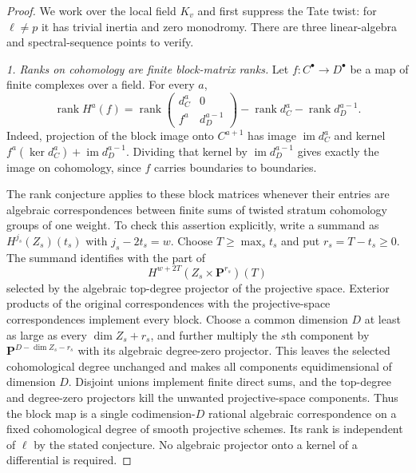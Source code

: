 \begin{proof}
We work over the local field $K_v$ and first suppress the Tate twist:
for $\ell\ne p$ it has trivial inertia and zero monodromy.
There are three linear-algebra and spectral-sequence points to verify.

\emph{1. Ranks on cohomology are finite block-matrix ranks.}
Let $f:C^\bullet\to D^\bullet$ be a map of finite complexes over a
field. For every $a$,
\begin{equation}
\label{eq:c-induced-cohomology-rank}
 \operatorname{rank}H^a(f)
 =\operatorname{rank}
 \begin{pmatrix}
  d_C^a&0\\ f^a&d_D^{a-1}
 \end{pmatrix}
 -\operatorname{rank}d_C^a-\operatorname{rank}d_D^{a-1}.
\end{equation}
Indeed, projection of the block image onto $C^{a+1}$ has image
$\operatorname{im}d_C^a$ and kernel
$f^a(\ker d_C^a)+\operatorname{im}d_D^{a-1}$.
Dividing that kernel by $\operatorname{im}d_D^{a-1}$ gives exactly
the image on cohomology, since $f$ carries boundaries to boundaries.

The rank conjecture applies to these block matrices whenever their
entries are algebraic correspondences between finite sums of twisted
stratum cohomology groups of one weight. To check this assertion
explicitly, write a summand as $H^{j_s}(Z_s)(t_s)$ with
$j_s-2t_s=w$. Choose $T\geq\max_s t_s$ and put
$r_s=T-t_s\geq0$. The summand identifies with the part of
\[
 H^{w+2T}(Z_s\times\mathbf P^{r_s})(T)
\]
selected by the algebraic top-degree projector of the projective
space. Exterior products of the original correspondences with the
projective-space correspondences implement every block.
Choose a common dimension $D$ at least as large as every
$\dim Z_s+r_s$, and further multiply the $s$th component by
$\mathbf P^{D-\dim Z_s-r_s}$ with its algebraic degree-zero
projector. This leaves the selected cohomological degree unchanged
and makes all components equidimensional of dimension $D$.
Disjoint unions implement finite direct sums, and the top-degree
and degree-zero projectors kill the unwanted projective-space
components. Thus the block map is a single codimension-$D$
rational algebraic correspondence
on a fixed cohomological degree of smooth projective schemes.
Its rank is independent of $\ell$ by the stated conjecture.
No algebraic projector onto a kernel of a differential is required.


\end{proof}

